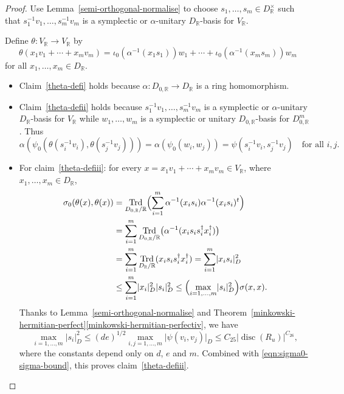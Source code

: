 \documentclass[11pt]{article}
\numberwithin{equation}{section}
\newcommand{\bR}{\mathbb{R}}
\DeclareMathOperator{\disc}{disc}
\DeclareMathOperator{\Trd}{Trd}
\newcommand{\abs}[1]{\lvert #1 \rvert}
\begin{document}
\begin{proof}
Use Lemma~\ref{semi-orthogonal-normalise} to choose $s_1, \dotsc, s_m \in D_\bR^\times$ such that $s_1^{-1} v_1, \dotsc, s_m^{-1} v_m$ is a symplectic or $\alpha$-unitary $D_\bR$-basis for $V_\bR$.

Define $\theta \colon V_\bR \to V_\bR$ by
\[
\theta(x_1v_1 + \dotsb + x_mv_m) = \iota_0(\alpha^{-1}(x_1 s_1))w_1 + \dotsb + \iota_0(\alpha^{-1}(x_m s_m))w_m
\]
for all $x_1, \dotsc, x_m \in D_\bR$.

\begin{itemize}
\item
Claim~\eqref{theta-defi} holds because $\alpha \colon D_{0,\bR} \to D_\bR$ is a ring homomorphism.

\item
Claim~\eqref{theta-defii} holds because $s_1^{-1} v_1, \dotsc, s_m^{-1} v_m$ is a symplectic or $\alpha$-unitary $D_\bR$-basis for $V_\bR$ while $w_1, \dotsc, w_m$ is a symplectic or unitary $D_{0,\bR}$-basis for $D_{0,\bR}^m$.
Thus
\[
\alpha(\psi_0(\theta(s_i^{-1} v_i), \theta(s_j^{-1} v_j))) = \alpha(\psi_0(w_i, w_j)) = \psi(s_i^{-1} v_i, s_j^{-1} v_j) \quad\text{for all } i, j.
\]

\item
For claim~\eqref{theta-defiii}: for every $x = x_1v_1 + \dotsb + x_mv_m \in V_\bR$, where $x_1, \dotsc, x_m \in D_\bR$,
\begin{equation}\label{eqn:sigma0-sigma-bound}
\begin{aligned}
\sigma_0(\theta(x), \theta(x))
& = \Trd_{D_{0,\bR}/\bR} \Bigl( \sum_{i=1}^m \alpha^{-1}(x_is_i) \alpha^{-1}(x_is_i)^t \Bigr)
\\& = \sum_{i=1}^m \Trd_{D_{0,\bR}/\bR} \bigl( \alpha^{-1}(x_is_i s_i^\dag x_i^\dag) \bigr)
\\& = \sum_{i=1}^m \Trd_{D_\bR/\bR}(x_is_i s_i^\dag x_i^\dag)
= \sum_{i=1}^m \abs{x_is_i}_D^2
\\& \leq \sum_{i=1}^m \abs{x_i}_D^2 \abs{s_i}_D^2
\leq \Bigl( \max_{i=1,\dotsc,m} \abs{s_i}_D^2 \Bigr) \sigma(x, x).
\end{aligned}
\end{equation}
Thanks to Lemma~\ref{semi-orthogonal-normalise} and Theorem~\ref{minkowski-hermitian-perfect}\eqref{minkowski-hermitian-perfectiv}, we have
\[
\max_{i=1, \dotsc, m} \abs{s_i}_D^2
\leq (de)^{1/2} \max_{i,j = 1, \dotsc, m} \abs{\psi(v_i, v_j)}_D
\leq C_{25} \abs{\disc(R_u)}^{C_{26}},
\]
where the constants depend only on $d$, $e$ and $m$.
Combined with \eqref{eqn:sigma0-sigma-bound}, this proves claim~\eqref{theta-defiii}.\qedhere
\end{itemize}
\end{proof}
\end{document}
